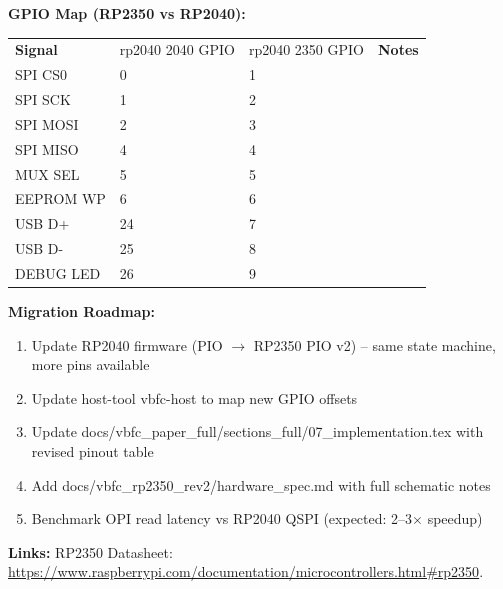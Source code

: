 \documentclass[11pt,a4paper,oneside]{article}
\newcommand{\rp}{\gls{rp2040}\xspace}
\begin{document}
\textbf{GPIO Map (RP2350 vs RP2040):}
\begin{tabular}{lll}
  \textbf{Signal} & \rp2040 GPIO & \rp2350 GPIO & \textbf{Notes} \\
  SPI CS0 & 0 & 1 & \\
  SPI SCK & 1 & 2 & \\
  SPI MOSI & 2 & 3 & \\
  SPI MISO & 4 & 4 & \\
  MUX SEL & 5 & 5 & \\
  EEPROM WP & 6 & 6 & \\
  USB D+ & 24 & 7 & \\
  USB D- & 25 & 8 & \\
  DEBUG LED & 26 & 9 & \\
\end{tabular}

\textbf{Migration Roadmap:}
\begin{enumerate}
  \item Update RP2040 firmware (PIO $\rightarrow$ RP2350 PIO v2) -- same state machine, more pins available
  \item Update host-tool vbfc-host to map new GPIO offsets
  \item Update docs/vbfc_paper_full/sections_full/07_implementation.tex with revised pinout table
  \item Add docs/vbfc_rp2350_rev2/hardware_spec.md with full schematic notes
  \item Benchmark OPI read latency vs RP2040 QSPI (expected: 2--3$\times$ speedup)
\end{enumerate}

\textbf{Links:} RP2350 Datasheet: \url{https://www.raspberrypi.com/documentation/microcontrollers.html\#rp2350}.

\end{document}

